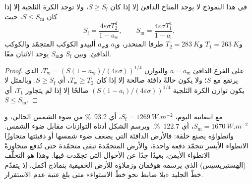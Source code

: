 \begin{proposition}\label{prop:b2:precambrian-earth:tipping}
في هذا النموذج لا يوجد المناخ الدافئ إلا إذا كان $S \ge S_{\text{f}}$، ولا توجد الكرة الثلجية إلا إذا كان
$S \le S_{\text{m}}$، حيث
\[
  S_{\text{f}} = \frac{4\varepsilon\sigma T_2^4}{1 - a_{\text{w}}}, \qquad
  S_{\text{m}} = \frac{4\varepsilon\sigma T_1^4}{1 - a_{\text{i}}},
\]
و$T_1 = \qty{263}{K}$ و$T_2 = \qty{283}{K}$ طرفا المنحدر، و$a_{\text{i}}$
و$a_{\text{w}}$ ألبيدو الكوكب المتجمّد والكوكب الدافئ. وبين $S_{\text{f}}$
و$S_{\text{m}}$ يوجد الاثنان معًا.
\end{proposition}

\begin{proof}
على الفرع الدافئ $a = a_{\text{w}}$ والتوازن $T_{\text{w}} = (S(1 -
a_{\text{w}})/(4\varepsilon\sigma))^{1/4}$، الذي يرتفع مع $S$؛ ولا يكون حالةً دافئة صالحة إلا
إذا كان $T_{\text{w}} \ge T_2$، أي $S \ge S_{\text{f}}$. وبالمثل لا يكون توازن الكرة الثلجية
$(S(1 - a_{\text{i}})/(4\varepsilon\sigma))^{1/4}$ صالحًا إلا إذا لم يتجاوز $T_1$، أي
$S \le S_{\text{m}}$.
\end{proof}

مع انبعاثية اليوم، $S_{\text{f}} = \qty{1269}{W.m^{-2}}$، أي \qty{93.2}{\percent} من ضوء الشمس
الحالي، و$S_{\text{m}} = \qty{1670}{W.m^{-2}}$، أي \qty{122.7}{\percent}. ويرسم الشكل أدناه
التوازنات مقابل ضوء الشمس. وانطواؤه يصنع حلقة: فالأرض الدافئة التي يضعف ضوء شمسها
أو دفيئتها متجاوزًا الانطواء الأيسر تتجمّد دفعة واحدة، والأرض المتجمّدة تبقى متجمّدة
حتى تُدفع متجاوزةً الانطواء الأيمن، بعيدًا جدًا عن الأحوال التي تجمّدت فيها. وهذا هو
التخلّف (الهستيريسيس) الذي يرسمه هوفمان وزملاؤه للأرض الحقيقية بنماذج أكمل،
إذ يتقدّم خطّ الجليد «بلا ضابط نحو خطّ الاستواء» متى بلغ عتبة
عدم الاستقرار.

